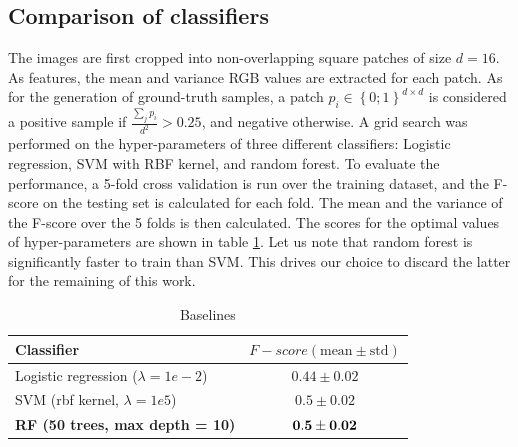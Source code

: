 \documentclass[10pt,conference,compsocconf]{IEEEtran}
\begin{document}
\subsection{Comparison of classifiers}
\label{baseline_selection}
The images are first cropped into non-overlapping square patches of size $d = 16$. As features,
the mean and variance RGB values are extracted for each patch. As for the
generation of ground-truth samples, a patch $p_i \in \left\{0;1\right\}^{d
  \times d}$ is considered a positive sample if $\frac{\sum_{j}{p_i}}{d^2} >
0.25$, and negative otherwise. A grid search was performed on the
hyper-parameters of three different classifiers: Logistic regression, SVM with
RBF kernel, and random forest. To evaluate the performance, a 5-fold cross
validation is run over the training dataset, and the F-score on the testing set
is calculated for each fold. The mean and the variance of the F-score over the 5
folds is then calculated. The scores for the optimal values of hyper-parameters
are shown in table \ref{table:baselines}. Let us note that random forest is significantly faster to train than SVM. This drives our choice to discard the latter for the remaining of this work.
		\begin{table}[h]
		\centering
		\begin{tabular}{p{} c}		
			\textbf{Classifier} &  \textbf{$F-score (\text{mean}\pm \text{std})$}\\
			\hline \hline
			Logistic regression ($\lambda = 1e-2$) & $0.44 \pm 0.02$ \\ \hline
			SVM (rbf kernel, $\lambda = 1e5$) & $0.5 \pm 0.02$ \\ \hline
			\textbf{RF (50 trees, max depth = 10)} & $\bf{0.5 \pm 0.02}$ \\
			\hline
		\end{tabular}
		\caption{\label{table:baselines}Baselines}
		\end{table}
\end{document}

